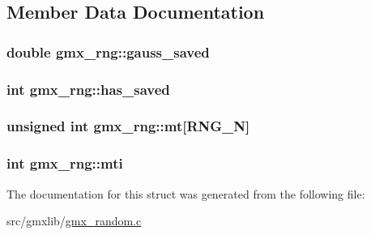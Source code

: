 \subsection{\-Member \-Data \-Documentation}
\hypertarget{structgmx__rng_ada049c9ea022ddbe17e52e38f6c0d0f1}{
\subsubsection[{gauss\-\_\-saved}]{\setlength{\rightskip}{0pt plus 5cm}double {\bf gmx\-\_\-rng\-::gauss\-\_\-saved}}}\label{structgmx__rng_ada049c9ea022ddbe17e52e38f6c0d0f1}
\hypertarget{structgmx__rng_a59b7a4e9bf9bd8ea07b2c1e42faf6d3b}{
\subsubsection[{has\-\_\-saved}]{\setlength{\rightskip}{0pt plus 5cm}int {\bf gmx\-\_\-rng\-::has\-\_\-saved}}}\label{structgmx__rng_a59b7a4e9bf9bd8ea07b2c1e42faf6d3b}
\hypertarget{structgmx__rng_a11c217d8fe195f4a4c674d08db70371f}{
\subsubsection[{mt}]{\setlength{\rightskip}{0pt plus 5cm}unsigned int {\bf gmx\-\_\-rng\-::mt}\mbox{[}{\bf \-R\-N\-G\-\_\-\-N}\mbox{]}}}\label{structgmx__rng_a11c217d8fe195f4a4c674d08db70371f}
\hypertarget{structgmx__rng_a41008c4b3785fa5ec5977eaa2e60a2c1}{
\subsubsection[{mti}]{\setlength{\rightskip}{0pt plus 5cm}int {\bf gmx\-\_\-rng\-::mti}}}\label{structgmx__rng_a41008c4b3785fa5ec5977eaa2e60a2c1}


\-The documentation for this struct was generated from the following file\-:\begin{DoxyCompactItemize}
\item 
src/gmxlib/\hyperlink{gmx__random_8c}{gmx\-\_\-random.\-c}\end{DoxyCompactItemize}
